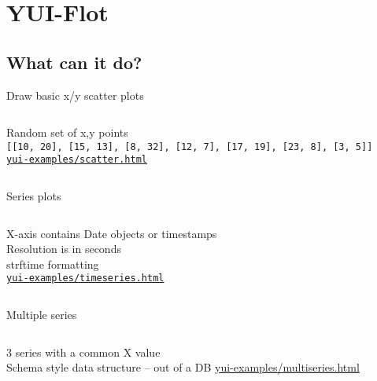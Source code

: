 \documentclass{beamer}
\begin{document}
\section{YUI-Flot}
\subsection{What can it do?}

\begin{frame}{Draw basic x/y scatter plots}
  \begin{columns}[c]
    \begin{block}{}
      \small{
      Random set of x,y points \\
      \texttt{\tiny{[[10, 20], [15, 13], [8, 32], [12, 7], [17, 19], [23, 8], [3, 5]]} \\
      \href{http://bluesmoon.github.com/yui-flot/yui-examples/scatter.html}{yui-examples/scatter.html}}
      }
    \end{block}
  \end{columns}
\end{frame}

\begin{frame}{Series plots}
  \begin{columns}[c]
    \begin{block}{}
      \small{
      X-axis contains Date objects or timestamps \\
      Resolution is in seconds \\
      strftime formatting \\
      \href{http://bluesmoon.github.com/yui-flot/yui-examples/timeseries.html}{\texttt{yui-examples/timeseries.html}}
      }
    \end{block}
  \end{columns}
\end{frame}

\begin{frame}{Multiple series}
  \begin{columns}[c]
    \begin{block}{}
      \small{3 series with a common X value} \\
      \small{Schema style data structure -- out of a DB}
      \href{http://bluesmoon.github.com/yui-flot/yui-examples/multiseries.html}{\small{yui-examples/multiseries.html}} \\
    \end{block}
  \end{columns}
\end{frame}
\end{document}
